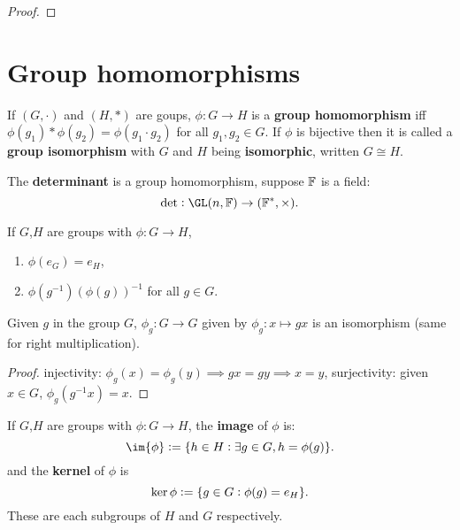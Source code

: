 \documentclass[../Year1/Year1.tex]{subfiles}
\begin{document}
\begin{proof}
    
\end{proof}

\section{Group homomorphisms}

\begin{definition}
    If $(G,\cdot)$ and $(H,\ast)$ are goups, $\phi:G\rightarrow H$ is a \textbf{group homomorphism} iff $\phi(g_1)\ast\phi(g_2) = \phi(g_1\cdot g_2)$ for all $g_1,g_2\in G$. If $\phi$ is bijective then it is called a \textbf{group isomorphism} with $G$ and $H$ being \textbf{isomorphic}, written $G\cong H$.
\end{definition}

\begin{example}[determinant]
    The \textbf{determinant} is a group homomorphism, suppose $\mathbb{F}$ is a field:\[
    \det: \GL(n,\FF)\rightarrow(\FF^*,\times)
    \textcolor{black}{.}
    \]
\end{example}

\vspace{-30pt}

\begin{lemma}
    If $G$,$H$ are groups with $\phi:G\rightarrow H$, \begin{enumerate}
        \item $\phi(e_G) = e_H$,
        \item $\phi(g^{-1}) {(\phi(g))}^{-1}$ for all $g\in G$.
    \end{enumerate}
\end{lemma}

\begin{lemma}\label{bijection from element}
    Given $g$ in the group $G$, $\phi_g:G\rightarrow G$ given by $\phi_g:x\mapsto gx$ is an isomorphism (same for right multiplication).
\end{lemma}

\begin{proof}
    injectivity: $\phi_g(x)=\phi_g(y)\implies gx=gy \implies x=y$, \qquad surjectivity: given $x\in G$, $\phi_g(g^{-1}x)=x$.
\end{proof}

\begin{definition}
    If $G$,$H$ are groups with $\phi:G\rightarrow H$, the \textbf{image} of $\phi$ is: \[
        \im{\phi} := \{h\in H:\exists g\in G, h = \phi(g)\}
    \textcolor{black}{.}
    \] and the \textbf{kernel} of $\phi$ is \[
        \ker{\phi} := \{g\in G: \phi(g)=e_H\}
    \textcolor{black}{.}
    \]
    These are each subgroups of $H$ and $G$ respectively.
\end{definition}
\end{document}
